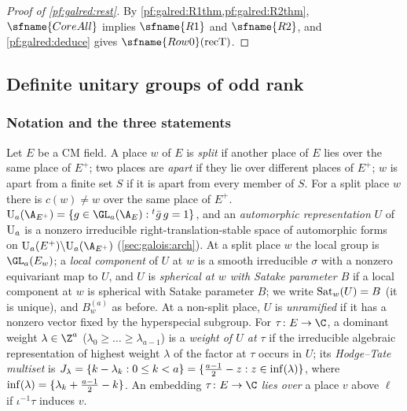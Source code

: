 \begin{proof}[Proof of \cref{pf:galred:rest}]
By \cref{pf:galred:R1thm,pf:galred:R2thm}, $\sfname{CoreAll}$ implies $\sfname{R1}$ and $\sfname{R2}$, and
\cref{pf:galred:deduce} gives $\sfname{Row0}(\mathrm{recT})$.
\end{proof}

\subsection{Definite unitary groups of odd rank}\label{sec:pf:galred:odd}

\subsubsection{Notation and the three statements}\label{sec:pf:galred:oddstmts}

Let $E$ be a CM field. A place $w$ of $E$ is \emph{split} if another place of $E$ lies over the same place of $E^+$;
two places are \emph{apart} if they lie over different places of $E^+$; $w$ is apart from a finite set $S$ if it
is apart from every member of $S$. For a split place $w$ there is $c(w)\ne w$ over the same place of $E^+$.
$\galredU_a(\A_{E^+})=\{g\in\GL_a(\A_E):{}^t\bar g\,g=1\}$, and an \emph{automorphic representation} $U$ of $\mathrm{U}_a$
is a nonzero irreducible right-translation-stable space of automorphic forms on
$\galredU_a(E^+)\backslash\galredU_a(\A_{E^+})$ (\cref{sec:galois:arch}). At a split place $w$ the local group is
$\GL_a(E_w)$; a \emph{local component} of $U$ at $w$ is a smooth irreducible $\sigma$ with a nonzero equivariant map to
$U$, and $U$ is \emph{spherical at $w$ with Satake parameter $B$} if a local component at $w$ is spherical with Satake
parameter $B$; we write $\operatorname{Sat}_w(U)=B$ (it is unique), and $B^{(a)}_w$ as before. At a non-split place, $U$ is
\emph{unramified} if it has a nonzero vector fixed by the hyperspecial subgroup. For $\tau\colon E\to\C$, a dominant
weight $\lambda\in\Z^a$ ($\lambda_0\ge\dots\ge\lambda_{a-1}$) is a \emph{weight of $U$ at $\tau$} if the irreducible algebraic
representation of highest weight $\lambda$ of the factor at $\tau$ occurs in $U$; its \emph{Hodge--Tate multiset} is
$J_\lambda=\{k-\lambda_k:0\le k<a\}=\{\frac{a-1}2-z:z\in\operatorname{inf}(\lambda)\}$, where
$\operatorname{inf}(\lambda)=\{\lambda_k+\frac{a-1}2-k\}$. An embedding $\tau\colon E\to\C$ \emph{lies over} a place $v$ above
$\ell$ if $\iota^{-1}\tau$ induces $v$.

